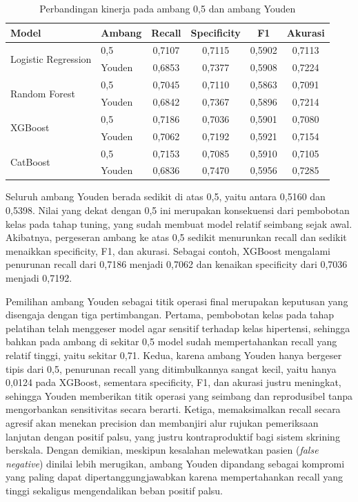 \begin{table}[H]
\centering
\caption{Perbandingan kinerja pada ambang 0,5 dan ambang Youden}
\label{tab:default-vs-youden}
\begin{tabular}{llcccc}
\toprule
\textbf{Model} & \textbf{Ambang} & \textbf{Recall} & \textbf{Specificity} & \textbf{F1} & \textbf{Akurasi} \\
\midrule
\multirow{2}{*}{Logistic Regression} & 0,5    & 0,7107 & 0,7115 & 0,5902 & 0,7113 \\
                                     & Youden & 0,6853 & 0,7377 & 0,5908 & 0,7224 \\
\midrule
\multirow{2}{*}{Random Forest}       & 0,5    & 0,7045 & 0,7110 & 0,5863 & 0,7091 \\
                                     & Youden & 0,6842 & 0,7367 & 0,5896 & 0,7214 \\
\midrule
\multirow{2}{*}{XGBoost}             & 0,5    & 0,7186 & 0,7036 & 0,5901 & 0,7080 \\
                                     & Youden & 0,7062 & 0,7192 & 0,5921 & 0,7154 \\
\midrule
\multirow{2}{*}{CatBoost}            & 0,5    & 0,7153 & 0,7085 & 0,5910 & 0,7105 \\
                                     & Youden & 0,6836 & 0,7470 & 0,5956 & 0,7285 \\
\bottomrule
\end{tabular}
\end{table}

Seluruh ambang Youden berada sedikit di atas 0,5, yaitu antara 0,5160 dan 0,5398. Nilai yang dekat dengan 0,5 ini merupakan konsekuensi dari pembobotan kelas pada tahap tuning, yang sudah membuat model relatif seimbang sejak awal. Akibatnya, pergeseran ambang ke atas 0,5 sedikit menurunkan recall dan sedikit menaikkan specificity, F1, dan akurasi. Sebagai contoh, XGBoost mengalami penurunan recall dari 0,7186 menjadi 0,7062 dan kenaikan specificity dari 0,7036 menjadi 0,7192.

Pemilihan ambang Youden sebagai titik operasi final merupakan keputusan yang disengaja dengan tiga pertimbangan. Pertama, pembobotan kelas pada tahap pelatihan telah menggeser model agar sensitif terhadap kelas hipertensi, sehingga bahkan pada ambang di sekitar 0,5 model sudah mempertahankan recall yang relatif tinggi, yaitu sekitar 0,71. Kedua, karena ambang Youden hanya bergeser tipis dari 0,5, penurunan recall yang ditimbulkannya sangat kecil, yaitu hanya 0,0124 pada XGBoost, sementara specificity, F1, dan akurasi justru meningkat, sehingga Youden memberikan titik operasi yang seimbang dan reprodusibel tanpa mengorbankan sensitivitas secara berarti. Ketiga, memaksimalkan recall secara agresif akan menekan precision dan membanjiri alur rujukan pemeriksaan lanjutan dengan positif palsu, yang justru kontraproduktif bagi sistem skrining berskala. Dengan demikian, meskipun kesalahan melewatkan pasien (\emph{false negative}) dinilai lebih merugikan, ambang Youden dipandang sebagai kompromi yang paling dapat dipertanggungjawabkan karena mempertahankan recall yang tinggi sekaligus mengendalikan beban positif palsu.

